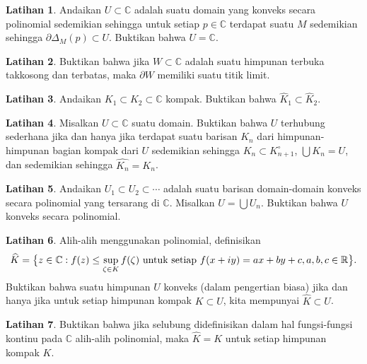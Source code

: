 \documentclass[12pt,openany]{book}
\newcommand{\avoidbreak}{\postdisplaypenalty=100}
\newcommand{\C}{{\mathbb{C}}}
\newcommand{\R}{{\mathbb{R}}}
\theoremstyle{plain}
\theoremstyle{remark}
\theoremstyle{definition}
\newenvironment{exbox}{%
    \def\FrameCommand{\vrule width 1pt \relax\hspace{10pt}}%
    \MakeFramed{\advance\hsize-\width\FrameRestore}%
}{%
    \endMakeFramed
}
\theoremstyle{exercise}
\newtheorem{exercise}{Latihan}[section]
\theoremstyle{example}
\begin{document}
\begin{exbox}
\begin{exercise}
Andaikan $U \subset \C$ adalah suatu domain yang konveks secara polinomial sedemikian sehingga untuk setiap
$p \in \C$ terdapat suatu $M$ sedemikian sehingga $\partial \Delta_M(p) \subset U$.
Buktikan bahwa $U = \C$.
\end{exercise}

\begin{exercise}
Buktikan bahwa jika $W \subset \C$ adalah suatu himpunan terbuka takkosong dan terbatas, maka $\partial W$ memiliki suatu
titik limit.
\end{exercise}

\begin{exercise}
Andaikan $K_1 \subset K_2 \subset \C$ kompak.  Buktikan bahwa
$\widehat{K}_1 \subset \widehat{K}_2$.
\end{exercise}

\begin{exercise}
Misalkan $U \subset \C$ suatu domain.  Buktikan bahwa $U$
terhubung sederhana jika dan hanya jika terdapat suatu barisan $K_n$
dari himpunan-himpunan bagian kompak dari $U$ sedemikian sehingga $K_n \subset K^\circ_{n+1}$,
$\bigcup K_n = U$, dan sedemikian sehingga $\widehat{K_n} = K_n$.
\end{exercise}

\begin{exercise}
Andaikan $U_1 \subset U_2 \subset \cdots$ adalah suatu barisan
domain-domain konveks secara polinomial yang tersarang di $\C$.  Misalkan $U = \bigcup U_n$.
Buktikan bahwa $U$ konveks secara polinomial.
\end{exercise}

\begin{exercise}
Alih-alih menggunakan polinomial, definisikan
\begin{equation*}
\widehat{K} = \bigl\{ z \in \C : f(z) \leq \sup_{\zeta \in K}
f(\zeta) \text{ untuk setiap } f(x+iy) = ax+by + c, 
a,b,c \in \R
\bigr\}.
\avoidbreak
\end{equation*}
Buktikan bahwa suatu himpunan $U$ konveks (dalam pengertian biasa) jika dan hanya
jika untuk setiap himpunan kompak $K \subset U$, kita mempunyai $\widehat{K} \subset U$.
\end{exercise}

\begin{exercise}
Buktikan bahwa jika selubung didefinisikan dalam hal fungsi-fungsi kontinu pada $\C$
alih-alih polinomial, maka $\widehat{K} = K$ untuk setiap himpunan kompak $K$.
\end{exercise}
\end{exbox}
\end{document}
